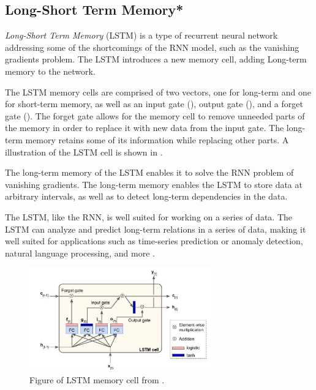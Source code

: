 \subsection{Long-Short Term Memory*}
\label{section:BT:LSTM}

\textit{Long-Short Term Memory} (LSTM) is a type of recurrent neural network addressing some of the shortcomings of the RNN model,
such as the vanishing gradients problem.
The LSTM introduces a new memory cell, adding Long-term memory to the network.

The LSTM memory cells are comprised of two vectors, one for long-term and one for short-term memory,
as well as an input gate (), output gate (),
and a forget gate ().
The forget gate allows for the memory cell to remove unneeded parts of the memory in order to replace it with new data from the input gate.
The long-term memory retains some of its information while replacing other parts.
A illustration of the LSTM cell is shown in .

The long-term memory of the LSTM enables it to solve the RNN problem of vanishing gradients.
The long-term memory enables the LSTM to store data at arbitrary intervals, as well as to detect long-term dependencies in the data.

The LSTM, like the RNN, is well suited for working on a series of data.
The LSTM can analyze and predict long-term relations in a series of data, making it well suited for applications such as time-series prediction or anomaly detection,
natural language processing, and more
\cite[p.~492-493]{Geron2017}.

\begin{figure}[h!]
  \centering
  \includegraphics[width=0.7\textwidth]{./sections/BT/figures/lstm_cell_hands_on.png}
  \hfill
  \caption{Figure of LSTM memory cell from \cite[p.~492]{Geron2017}.}
  \label{fig:lstm-memory-cell}
\end{figure}

